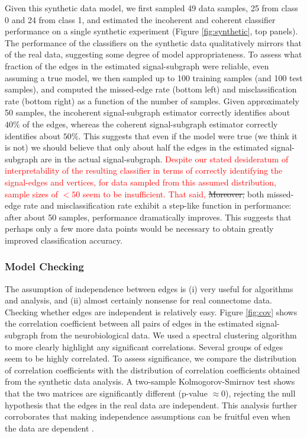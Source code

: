 \documentclass[10pt,journal,cspaper,compsoc]{IEEEtran}
\providecommand{\tr}[1]{\textcolor{red}{#1}}
\begin{document}
Given this synthetic data model, we first sampled 49 data samples, 25 from class 0 and 24 from class 1, and estimated the incoherent and coherent classifier performance on a single synthetic experiment (Figure \ref{fig:synthetic}, top panels).  The performance of the classifiers on the synthetic data qualitatively mirrors that of the real data, suggesting some degree of model appropriateness.  To assess what fraction of the edges in the estimated signal-subgraph were reliable, even assuming a true model, we then sampled up to 100 training samples (and 100 test samples), and computed the missed-edge rate (bottom left) and misclassification rate (bottom right) as a function of the number of samples.  Given approximately 50 samples, the incoherent signal-subgraph estimator correctly identifies about $40\%$ of the edges, whereas the coherent signal-subgraph estimator correctly identifies about $50\%$.  This suggests that even if the model were true (we think it is not) we should believe  that only about half the edges in the estimated signal-subgraph are in the actual signal-subgraph.  
\tr{Despite  our stated desideratum of interpretability of the resulting classifier in terms of correctly identifying the signal-edges and vertices, for data sampled from this assumed distribution, sample sizes of $<50$ seem to be insufficient.  That said, }
\sout{Moreover,} both missed-edge rate and misclassification rate exhibit a step-like function in performance: after about 50 samples, performance dramatically improves.  This suggests that perhaps only a few more data points would be necessary to obtain greatly improved classification accuracy.  


\subsubsection{Model Checking} %
\label{ssub:model_checking}


The assumption of independence between edges is (i) very useful for algorithms and analysis, and (ii) almost certainly nonsense for real connectome data.  Checking whether edges are independent is relatively easy.  Figure \ref{fig:cov} shows the correlation coefficient between all pairs of edges in the estimated signal-subgraph from the neurobiological data.  We used a spectral clustering algorithm \cite{Dhillon2001} to  more clearly highlight any significant correlations.  Several groups of edges seem to be highly correlated.  To assess significance, we compare the distribution of correlation coefficients with the distribution of correlation coefficients obtained from the synthetic data analysis.  A two-sample Kolmogorov-Smirnov test shows that the two matrices are significantly different (p-value $\approx 0$), rejecting the null hypothesis that the edges in the real data are independent. This analysis further corroborates that making independence assumptions can be fruitful even when the data are dependent \cite{Hand2001}.
\end{document}
